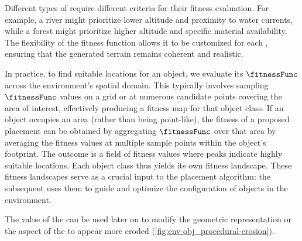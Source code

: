 Different types of  require different criteria for their fitness evaluation. For example, a river might prioritize lower altitude and proximity to water currents, while a forest might prioritize higher altitude and specific material availability. The flexibility of the fitness function allows it to be customized for each , ensuring that the generated terrain remains coherent and realistic.


In practice, to find suitable locations for an object, we evaluate its $\fitnessFunc$ across the environment's spatial domain. This typically involves sampling $\fitnessFunc$ values on a grid or at numerous candidate points covering the area of interest, effectively producing a fitness map for that object class. If an object occupies an area (rather than being point-like), the fitness of a proposed placement can be obtained by aggregating $\fitnessFunc$ over that area by averaging the fitness values at multiple sample points within the object's footprint. The outcome is a field of fitness values where peaks indicate highly suitable locations. Each object class thus yields its own fitness landscape. These fitness landscapes serve as a crucial input to the placement algorithm: the subsequent  uses them to guide and optimize the configuration of objects in the environment.

The value of the  can be used later on to modify the geometric representation or the aspect of the  to appear more eroded (\cref{fig:env-obj_procedural-erosion}).









